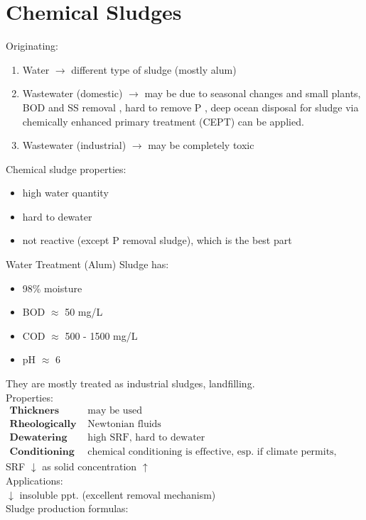 \documentclass[12pt]{article}
\newcommand{\cmark}{\ding{51}}%
\newcommand{\xmark}{\ding{55}}%
\begin{document}
\section{Chemical Sludges}
Originating:
\begin{enumerate}
    \item Water $\rightarrow$ different type of sludge (mostly alum)
    \item Wastewater (domestic) $\rightarrow$ may be due to seasonal changes and small plants, BOD and SS removal \cmark, hard to remove P \xmark, deep ocean disposal for sludge via chemically enhanced primary treatment (CEPT) can be applied.
    \item Wastewater (industrial) $\rightarrow$ may be completely toxic
\end{enumerate}
Chemical sludge properties:
\begin{itemize}
    \item high water quantity
    \item hard to dewater
    \item not reactive (except P removal sludge), which is the best part
\end{itemize}
Water Treatment (Alum) Sludge has:
\begin{itemize}
    \item 98\% moisture
    \item BOD $\approx$ 50 mg/L
    \item COD $\approx$ 500 - 1500 mg/L
    \item pH $\approx$ 6
\end{itemize}
They are mostly treated as industrial sludges, landfilling.\\
Properties:
\begin{align*}
    \textbf{Thickners} & \text{ may be used}\\
    \textbf{Rheologically} & \text{ Newtonian fluids}\\
    \textbf{Dewatering} & \text{ high SRF, hard to dewater}\\
    \textbf{Conditioning} & \text{ chemical conditioning is effective, esp. if climate permits, freezing/thawing}
\end{align*}
SRF $\downarrow$ as solid concentration $\uparrow$\\
Applications:\\
 $\downarrow$ insoluble ppt. (excellent removal mechanism)\\
Sludge production formulas:\\
\end{document}
